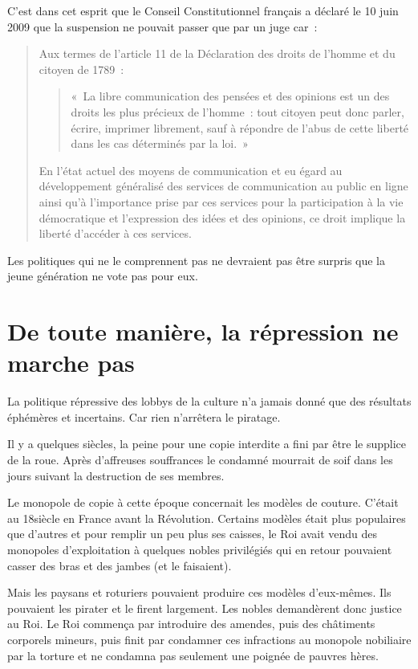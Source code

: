 C’est dans cet esprit que le Conseil Constitutionnel
français 
a déclaré le 10 juin 2009 que la suspension ne pouvait
passer que par un juge car~:
\begin{quotation}

Aux termes de l’article 11 de la Déclaration des droits de l’homme et du citoyen de 1789~:
\begin{quotation}
«~La libre communication des pensées et des opinions est un des droits les plus précieux de l’homme~: tout citoyen peut donc parler, écrire, imprimer librement, sauf à répondre de l’abus de cette
liberté dans les cas déterminés par la loi.~»
\end{quotation}

En l’état actuel des moyens de communication et eu égard au développement généralisé des services de
communication au public en ligne ainsi qu’à l’importance prise par ces services pour la
participation à la vie démocratique et l’expression des idées et des opinions, ce droit implique la
liberté d’accéder à ces services.
\end{quotation}

Les politiques qui ne le comprennent pas ne devraient pas être surpris que la jeune génération ne
vote pas pour eux.

\section{De toute manière, la répression ne marche pas}
La politique répressive des lobbys de la culture n’a jamais donné que des résultats éphémères et
incertains. Car rien n’arrêtera le piratage.

Il y a quelques siècles, la peine pour une copie interdite a fini par être le supplice de la roue.
Après d’affreuses souffrances le condamné mourrait de soif dans les jours suivant la destruction de
ses membres.

Le monopole de copie à cette époque concernait les modèles de couture. C’était au 18\ieme siècle en
France avant la Révolution. Certains modèles était plus populaires que d’autres et pour remplir un
peu plus ses caisses, le Roi avait vendu des monopoles d’exploitation à quelques nobles privilégiés qui en retour pouvaient casser des bras et des jambes (et le faisaient).

Mais les paysans et roturiers pouvaient produire ces modèles d’eux-mêmes. Ils pouvaient les
pirater et le firent largement. Les nobles demandèrent donc justice au Roi. Le Roi commença par
introduire des amendes, puis des châtiments corporels mineurs, puis finit par condamner ces
infractions au monopole nobiliaire par la torture et ne condamna pas seulement une poignée de
pauvres hères.


